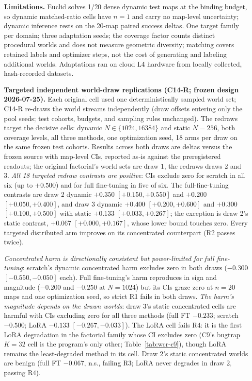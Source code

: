 \documentclass[letterpaper]{article} %
\newcommand{\stage}[1]{\textsc{#1}}
\begin{document}
\textbf{Limitations.} Euclid solves 1/20 dense dynamic test maps at the binding budget, so dynamic matched-ratio cells have $n{=}1$ and carry no map-level uncertainty; dynamic inference rests on the 20-map paired success deltas. One target family per domain; three adaptation seeds; the coverage factor counts distinct procedural worlds and does not measure geometric diversity; matching covers retained labels and optimizer steps, not the cost of generating and labeling additional worlds. Adaptations ran on cloud L4 hardware from locally collected, hash-recorded datasets.

\textbf{Targeted independent world-draw replications (C14-R; frozen design 2026-07-25).} Each original cell used one deterministically sampled world set; C14-R re-draws the world streams independently (draw offsets entering only the pool seeds; test cohorts, budgets, and sampling rules unchanged). The redraws target the decisive cells: dynamic $N \in \{1024, 16384\}$ and static $N{=}256$, both coverage levels, all three methods, one optimization seed, 18 arms per draw on the same frozen test cohorts. Results across both draws are deltas versus the frozen source with map-level CIs, reported as-is against the preregistered readouts; the original factorial's world sets are draw 1, the redraws draws 2 and 3. \emph{All 18 targeted redraw contrasts are positive}: CIs exclude zero for scratch in all six (up to $+0.500$) and for full fine-tuning in five of six. The full-fine-tuning contrasts are draw 2 dynamic $+0.350$ $[+0.150,+0.550]$ and $+0.200$ $[+0.050,+0.400]$, and draw 3 dynamic $+0.400$ $[+0.200,+0.600]$ and $+0.300$ $[+0.100,+0.500]$ with static $+0.133$ $[+0.033,+0.267]$; the exception is draw 2's static contrast, $+0.067$ $[+0.000,+0.167]$, whose lower bound touches zero. Every targeted distributed arm improves on its concentrated counterpart (R2 passes twice).

\emph{Concentrated harm is directionally consistent but power-limited for full fine-tuning}: scratch's dynamic concentrated harm excludes zero in both draws ($-0.300$ $[-0.550,-0.050]$ each). Full fine-tuning's harm reproduces in sign and magnitude ($-0.200$ and $-0.250$ at $N{=}1024$) but its CIs graze zero at $n{=}20$ maps and one optimization seed, so strict R1 fails in both draws. \emph{The harm's magnitude depends on the drawn worlds}: draw 3's static concentrated cells are harmful with CIs excluding zero for all three methods (full FT $-0.233$; scratch $-0.500$; LoRA $-0.133$ $[-0.267,-0.033]$). The LoRA cell fails R4: it is the first LoRA degradation in the factorial family whose CI excludes zero (\stage{C9}'s bugtrap $K{=}32$ cell is the program's only other; Table~\ref{tab:wcr-c9}), though LoRA remains the least-degraded method in its cell. Draw 2's static concentrated worlds are benign (full FT $-0.067$, n.s., failing R3; LoRA never degrades in draw 2, passing R4).
\end{document}
